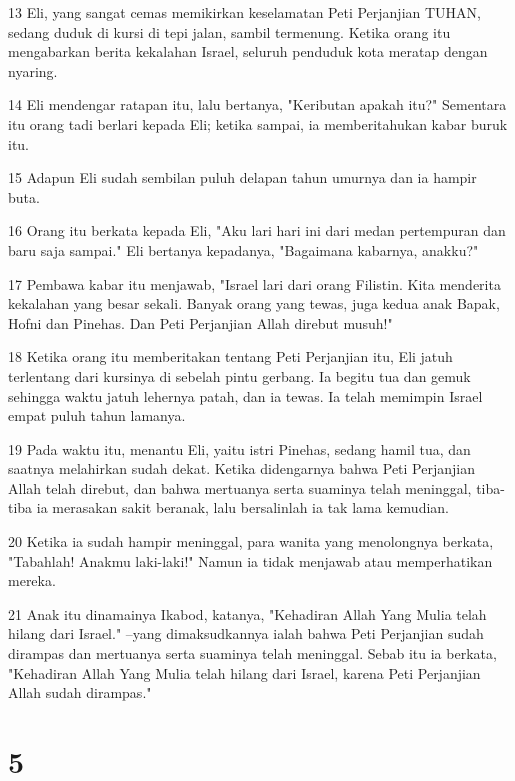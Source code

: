 \par 13 Eli, yang sangat cemas memikirkan keselamatan Peti Perjanjian TUHAN, sedang duduk di kursi di tepi jalan, sambil termenung. Ketika orang itu mengabarkan berita kekalahan Israel, seluruh penduduk kota meratap dengan nyaring.
\par 14 Eli mendengar ratapan itu, lalu bertanya, "Keributan apakah itu?" Sementara itu orang tadi berlari kepada Eli; ketika sampai, ia memberitahukan kabar buruk itu.
\par 15 Adapun Eli sudah sembilan puluh delapan tahun umurnya dan ia hampir buta.
\par 16 Orang itu berkata kepada Eli, "Aku lari hari ini dari medan pertempuran dan baru saja sampai." Eli bertanya kepadanya, "Bagaimana kabarnya, anakku?"
\par 17 Pembawa kabar itu menjawab, "Israel lari dari orang Filistin. Kita menderita kekalahan yang besar sekali. Banyak orang yang tewas, juga kedua anak Bapak, Hofni dan Pinehas. Dan Peti Perjanjian Allah direbut musuh!"
\par 18 Ketika orang itu memberitakan tentang Peti Perjanjian itu, Eli jatuh terlentang dari kursinya di sebelah pintu gerbang. Ia begitu tua dan gemuk sehingga waktu jatuh lehernya patah, dan ia tewas. Ia telah memimpin Israel empat puluh tahun lamanya.
\par 19 Pada waktu itu, menantu Eli, yaitu istri Pinehas, sedang hamil tua, dan saatnya melahirkan sudah dekat. Ketika didengarnya bahwa Peti Perjanjian Allah telah direbut, dan bahwa mertuanya serta suaminya telah meninggal, tiba-tiba ia merasakan sakit beranak, lalu bersalinlah ia tak lama kemudian.
\par 20 Ketika ia sudah hampir meninggal, para wanita yang menolongnya berkata, "Tabahlah! Anakmu laki-laki!" Namun ia tidak menjawab atau memperhatikan mereka.
\par 21 Anak itu dinamainya Ikabod, katanya, "Kehadiran Allah Yang Mulia telah hilang dari Israel." --yang dimaksudkannya ialah bahwa Peti Perjanjian sudah dirampas dan mertuanya serta suaminya telah meninggal. Sebab itu ia berkata, "Kehadiran Allah Yang Mulia telah hilang dari Israel, karena Peti Perjanjian Allah sudah dirampas."

\chapter{5}

